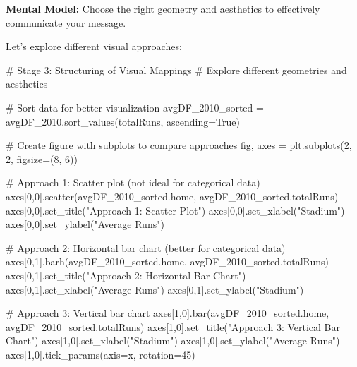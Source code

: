 \documentclass[
  letterpaper,
  DIV=11,
  numbers=noendperiod]{scrartcl}
\newenvironment{Shaded}{\begin{snugshade}}{\end{snugshade}}
\newcommand{\CommentTok}[1]{\textcolor[rgb]{0.37,0.37,0.37}{#1}}
\newcommand{\DecValTok}[1]{\textcolor[rgb]{0.68,0.00,0.00}{#1}}
\newcommand{\NormalTok}[1]{\textcolor[rgb]{0.00,0.23,0.31}{#1}}
\newcommand{\OperatorTok}[1]{\textcolor[rgb]{0.37,0.37,0.37}{#1}}
\newcommand{\StringTok}[1]{\textcolor[rgb]{0.13,0.47,0.30}{#1}}
\newcommand{\VariableTok}[1]{\textcolor[rgb]{0.07,0.07,0.07}{#1}}
\begin{document}
\textbf{Mental Model:} Choose the right geometry and aesthetics to
effectively communicate your message.

Let's explore different visual approaches:

\begin{Shaded}
\begin{Highlighting}[]
\CommentTok{\# Stage 3: Structuring of Visual Mappings}
\CommentTok{\# Explore different geometries and aesthetics}

\CommentTok{\# Sort data for better visualization}
\NormalTok{avgDF\_2010\_sorted }\OperatorTok{=}\NormalTok{ avgDF\_2010.sort\_values(}\StringTok{\textquotesingle{}totalRuns\textquotesingle{}}\NormalTok{, ascending}\OperatorTok{=}\VariableTok{True}\NormalTok{)}

\CommentTok{\# Create figure with subplots to compare approaches}
\NormalTok{fig, axes }\OperatorTok{=}\NormalTok{ plt.subplots(}\DecValTok{2}\NormalTok{, }\DecValTok{2}\NormalTok{, figsize}\OperatorTok{=}\NormalTok{(}\DecValTok{8}\NormalTok{, }\DecValTok{6}\NormalTok{))}

\CommentTok{\# Approach 1: Scatter plot (not ideal for categorical data)}
\NormalTok{axes[}\DecValTok{0}\NormalTok{,}\DecValTok{0}\NormalTok{].scatter(avgDF\_2010\_sorted.home, avgDF\_2010\_sorted.totalRuns)}
\NormalTok{axes[}\DecValTok{0}\NormalTok{,}\DecValTok{0}\NormalTok{].set\_title(}\StringTok{"Approach 1: Scatter Plot"}\NormalTok{)}
\NormalTok{axes[}\DecValTok{0}\NormalTok{,}\DecValTok{0}\NormalTok{].set\_xlabel(}\StringTok{"Stadium"}\NormalTok{)}
\NormalTok{axes[}\DecValTok{0}\NormalTok{,}\DecValTok{0}\NormalTok{].set\_ylabel(}\StringTok{"Average Runs"}\NormalTok{)}

\CommentTok{\# Approach 2: Horizontal bar chart (better for categorical data)}
\NormalTok{axes[}\DecValTok{0}\NormalTok{,}\DecValTok{1}\NormalTok{].barh(avgDF\_2010\_sorted.home, avgDF\_2010\_sorted.totalRuns)}
\NormalTok{axes[}\DecValTok{0}\NormalTok{,}\DecValTok{1}\NormalTok{].set\_title(}\StringTok{"Approach 2: Horizontal Bar Chart"}\NormalTok{)}
\NormalTok{axes[}\DecValTok{0}\NormalTok{,}\DecValTok{1}\NormalTok{].set\_xlabel(}\StringTok{"Average Runs"}\NormalTok{)}
\NormalTok{axes[}\DecValTok{0}\NormalTok{,}\DecValTok{1}\NormalTok{].set\_ylabel(}\StringTok{"Stadium"}\NormalTok{)}

\CommentTok{\# Approach 3: Vertical bar chart}
\NormalTok{axes[}\DecValTok{1}\NormalTok{,}\DecValTok{0}\NormalTok{].bar(avgDF\_2010\_sorted.home, avgDF\_2010\_sorted.totalRuns)}
\NormalTok{axes[}\DecValTok{1}\NormalTok{,}\DecValTok{0}\NormalTok{].set\_title(}\StringTok{"Approach 3: Vertical Bar Chart"}\NormalTok{)}
\NormalTok{axes[}\DecValTok{1}\NormalTok{,}\DecValTok{0}\NormalTok{].set\_xlabel(}\StringTok{"Stadium"}\NormalTok{)}
\NormalTok{axes[}\DecValTok{1}\NormalTok{,}\DecValTok{0}\NormalTok{].set\_ylabel(}\StringTok{"Average Runs"}\NormalTok{)}
\NormalTok{axes[}\DecValTok{1}\NormalTok{,}\DecValTok{0}\NormalTok{].tick\_params(axis}\OperatorTok{=}\StringTok{\textquotesingle{}x\textquotesingle{}}\NormalTok{, rotation}\OperatorTok{=}\DecValTok{45}\NormalTok{)}


\end{Highlighting}
\end{Shaded}
\end{document}
